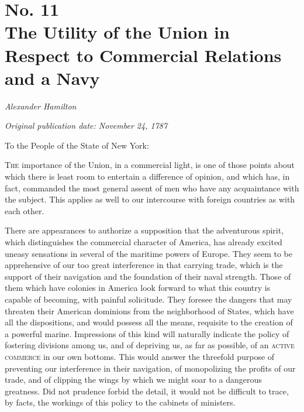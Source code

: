 \chapter[No. 11: The Utility of the Union in Respect to Commercial Relations and a Navy]{No. 11\\ {\small The Utility of the Union in Respect to Commercial Relations and a Navy}}

\textit{Alexander Hamilton}

\textit{Original publication date: November 24, 1787}
\vspace{1cm}

To the People of the State of New York:
\vspace{.4cm}

\textsc{The} importance of the Union, in a commercial light, is one of those points about which there is least room to entertain a difference of opinion, and which has, in fact, commanded the most general assent of men who have any acquaintance with the subject. 
This applies as well to our intercourse with foreign countries as with each other.

There are appearances to authorize a supposition that the adventurous spirit, which distinguishes the commercial character of America, has already excited uneasy sensations in several of the maritime powers of Europe. 
They seem to be apprehensive of our too great interference in that carrying trade, which is the support of their navigation and the foundation of their naval strength. 
Those of them which have colonies in America look forward to what this country is capable of becoming, with painful solicitude. 
They foresee the dangers that may threaten their American dominions from the neighborhood of States, which have all the dispositions, and would possess all the means, requisite to the creation of a powerful marine. 
Impressions of this kind will naturally indicate the policy of fostering divisions among us, and of depriving us, as far as possible, of an \textsc{active commerce} in our own bottoms. 
This would answer the threefold purpose of preventing our interference in their navigation, of monopolizing the profits of our trade, and of clipping the wings by which we might soar to a dangerous greatness. 
Did not prudence forbid the detail, it would not be difficult to trace, by facts, the workings of this policy to the cabinets of ministers.

